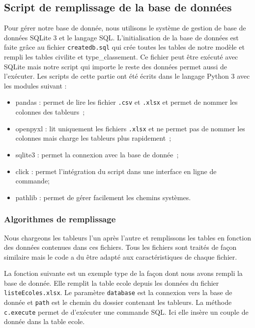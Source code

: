 \documentclass[12pt]{article}
\begin{document}
    \subsection{Script de remplissage de la base de données}
        Pour gérer notre base de donnée, nous utilisons le système de gestion de base de données \textsf{SQLite 3} et le langage \textsf{SQL}.
        L'initialisation de la base de données est faite grâce au fichier \texttt{createdb.sql} qui crée toutes les tables de notre modèle et rempli les tables civilite et type\_classement.
        Ce fichier peut être exécuté avec \textsf{SQLite} mais notre script qui importe le reste des données permet aussi de l'exécuter.
        Les scripts de cette partie ont été écrits dans le langage \textsf{Python 3} avec les modules suivant :
        \begin{itemize}[label=-]
            \item \textsf{pandas} : permet de lire les fichier \texttt{.csv} et \texttt{.xlsx} et permet de nommer les colonnes des tableurs~\cite{pd};
            \item \textsf{openpyxl} : lit uniquement les fichiers \texttt{.xlsx} et ne permet pas de nommer les colonnes mais charge les tableurs plus rapidement~\cite{xl};
            \item \textsf{sqlite3} : permet la connexion avec la base de donnée~\cite{sqlite};
            \item \textsf{click} : permet l'intégration du script dans une interface en ligne de commande;
            \item \textsf{pathlib} : permet de gérer facilement les chemins systèmes.
        \end{itemize}
        
        \subsubsection{Algorithmes de remplissage}
            Nous chargeons les tableurs l'un après l'autre et remplissons les tables en fonction des données contenues dans ces fichiers. Tous les fichiers sont traités de façon similaire mais le code a du être adapté aux caractéristiques de chaque fichier.
            
            La fonction suivante est un exemple type de la façon dont nous avons rempli la base de donnée. Elle remplit la table ecole depuis les données du fichier \texttt{listeEcoles.xlsx}.
            Le paramètre \verb|database| est la connexion vers la base de donnée et \verb|path| est le chemin du dossier contenant les tableurs. La méthode \verb|c.execute| permet de d'exécuter une commande \textsf{SQL}. Ici elle insère un couple de donnée dans la table ecole.
\end{document}
